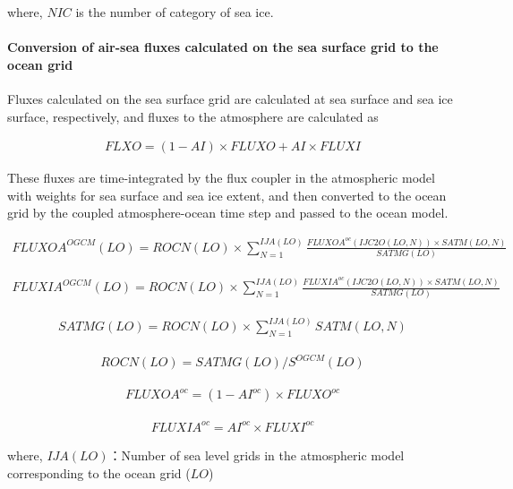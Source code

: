 where, \(NIC\) is the number of category of sea ice.

\hypertarget{conversion-of-air-sea-fluxes-calculated-on-the-sea-surface-grid-to-the-ocean-grid}{%
\paragraph{Conversion of air-sea fluxes calculated on the sea surface
grid to the ocean
grid}\label{conversion-of-air-sea-fluxes-calculated-on-the-sea-surface-grid-to-the-ocean-grid}}

Fluxes calculated on the sea surface grid are calculated at sea surface
and sea ice surface, respectively, and fluxes to the atmosphere are
calculated as

\begin{eqnarray} FLXO=(1-AI) \times FLUXO+AI \times FLUXI \end{eqnarray}

These fluxes are time-integrated by the flux coupler in the atmospheric
model with weights for sea surface and sea ice extent, and then
converted to the ocean grid by the coupled atmosphere-ocean time step
and passed to the ocean model.

\begin{eqnarray} FLUXOA^{OGCM}(LO) = ROCN(LO) \times \sum_{N=1}^{IJA(LO)} \frac{FLUXOA^{oc}(IJC2O(LO,N)) \times SATM(LO,N)}{SATMG(LO)} \end{eqnarray}

\begin{eqnarray} FLUXIA^{OGCM}(LO) = ROCN(LO) \times \sum_{N=1}^{IJA(LO)} \frac{FLUXIA^{oc}(IJC2O(LO,N)) \times SATM(LO,N)}{SATMG(LO)} \end{eqnarray}

\begin{eqnarray} SATMG(LO)=ROCN(LO) \times \sum_{N=1}^{IJA(LO)} SATM(LO,N) \end{eqnarray}

\begin{eqnarray} ROCN(LO)=SATMG(LO)/S^{OGCM}(LO) \end{eqnarray}

\begin{eqnarray} FLUXOA^{oc}=(1-AI^{oc}) \times FLUXO^{oc} \end{eqnarray}

\begin{eqnarray} FLUXIA^{oc}=AI^{oc} \times FLUXI^{oc} \end{eqnarray}

where, \(IJA(LO)\)：Number of sea level grids in the atmospheric model
corresponding to the ocean grid (\(LO\))

